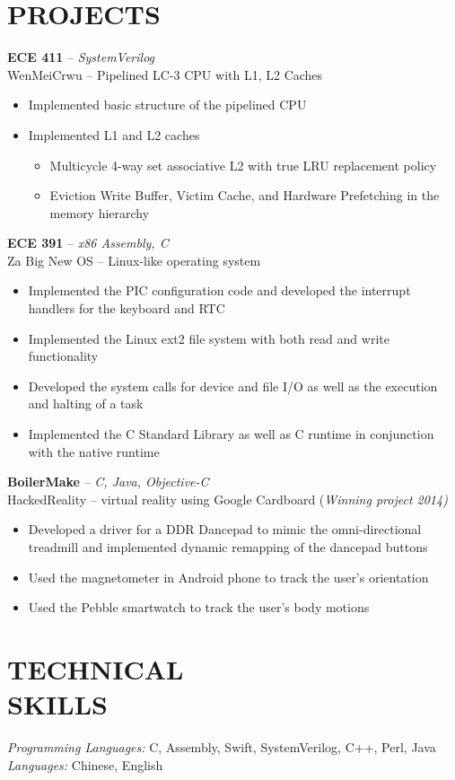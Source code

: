 \documentclass[resmargin]{res}
\begin{document}
\begin{resume}
\section{PROJECTS} 
{\bf ECE 411} -- {\sl SystemVerilog} \\
\textnormal {WenMeiCrwu -- Pipelined LC-3 CPU with L1, L2 Caches} 
\begin{itemize} \itemsep -2pt
\vspace {.5mm}
\item Implemented basic structure of the pipelined CPU
\item Implemented L1 and L2 caches 
	\begin{itemize} \itemsep -2pt
	\vspace{-2mm}
	\item Multicycle 4-way set associative L2 with true LRU replacement policy
	\vspace{0.5mm}
	\item Eviction Write Buffer, Victim Cache, and Hardware Prefetching in the memory hierarchy
	\vspace{-1.5mm}
	\end{itemize}
\end{itemize}
\vspace{-4mm}
{\bf ECE 391} -- {\sl x86 Assembly, C} \\ 
\textnormal {Za Big New OS -- Linux-like operating system} 
\begin{itemize} \itemsep -2pt
\vspace {.5mm}
\item Implemented the PIC configuration code and developed the interrupt handlers for the keyboard and RTC
\item Implemented the Linux ext2 file system with both read and write functionality
\item Developed the system calls for device and file I/O as well as the execution and halting of a task
\item Implemented the C Standard Library as well as C runtime in conjunction with the native runtime 
\end{itemize}
\vspace{-3mm}
{\bf BoilerMake} -- {\sl C, Java, Objective-C} \\
\textnormal {HackedReality -- virtual reality using Google Cardboard} (\sl {Winning project 2014})
\begin{itemize} \itemsep -2pt
\item Developed a driver for a DDR Dancepad to mimic the omni-directional treadmill and implemented dynamic remapping of the dancepad buttons
\item Used the magnetometer in Android phone to track the user's orientation
\item Used the Pebble smartwatch to track the user's body motions
\end{itemize}
\vspace{-3mm}

\section{TECHNICAL \\ SKILLS} 
{\sl Programming Languages:} C, Assembly, Swift, SystemVerilog, C++, Perl, Java\\
{\sl Languages:} Chinese, English

\end{resume}
\end{document}
